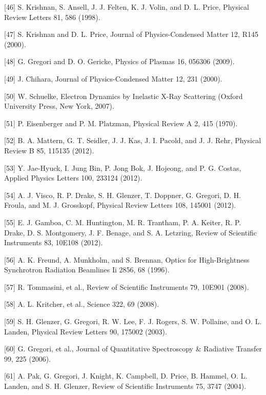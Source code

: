 {[}46{]} S. Krishnan, S. Ansell, J. J. Felten, K. J. Volin, and D. L. Price, Physical Review Letters 81, 586 (1998).

{[}47{]} S. Krishnan and D. L. Price, Journal of Physics-Condensed Matter 12, R145 (2000).

{[}48{]} G. Gregori and D. O. Gericke, Physics of Plasmas 16, 056306 (2009).

{[}49{]} J. Chihara, Journal of Physics-Condensed Matter 12, 231 (2000).

{[}50{]} W. Schuelke, Electron Dynamics by Inelastic X-Ray Scattering (Oxford University Press, New York, 2007).

{[}51{]} P. Eisenberger and P. M. Platzman, Physical Review A 2, 415 (1970).

{[}52{]} B. A. Mattern, G. T. Seidler, J. J. Kas, J. I. Pacold, and J. J. Rehr, Physical Review B 85, 115135 (2012).

{[}53{]} Y. Jae-Hyuck, I. Jung Bin, P. Jong Bok, J. Hojeong, and P. G. Costas, Applied Physics Letters 100, 233124 (2012).

{[}54{]} A. J. Visco, R. P. Drake, S. H. Glenzer, T. Doppner, G. Gregori, D. H. Froula, and M. J. Grosskopf, Physical Review Letters 108, 145001 (2012).

{[}55{]} E. J. Gamboa, C. M. Huntington, M. R. Trantham, P. A. Keiter, R. P. Drake, D. S. Montgomery, J. F. Benage, and S. A. Letzring, Review of Scientific Instruments 83, 10E108 (2012).

{[}56{]} A. K. Freund, A. Munkholm, and S. Brennan, Optics for High-Brightness Synchrotron Radiation Beamlines Ii 2856, 68 (1996).

{[}57{]} R. Tommasini, et al., Review of Scientific Instruments 79, 10E901 (2008).

{[}58{]} A. L. Kritcher, et al., Science 322, 69 (2008).

{[}59{]} S. H. Glenzer, G. Gregori, R. W. Lee, F. J. Rogers, S. W. Pollaine, and O. L. Landen, Physical Review Letters 90, 175002 (2003).

{[}60{]} G. Gregori, et al., Journal of Quantitative Spectroscopy \& Radiative Transfer 99, 225 (2006).

{[}61{]} A. Pak, G. Gregori, J. Knight, K. Campbell, D. Price, B. Hammel, O. L. Landen, and S. H. Glenzer, Review of Scientific Instruments 75, 3747 (2004).

\subsection{}\label{section}

